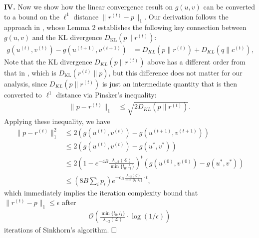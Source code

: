 \textbf{IV.} Now we show how the linear convergence result on $g(u,v)$ can be
converted to a bound on the $\ell^{1}$ distance $\|r^{(t)}-p\|_{1}$.
Our derivation follows the approach in \citet{altschuler2017near}, whose Lemma 2 establishes
the following key connection between $g(u,v)$ and the KL divergence
$D_{\text{KL}}(p\|r^{(t)})$: 
\begin{align*}
g(u^{(t)},v^{(t)})-g(u^{(t+1)},v^{(t+1)}) & =D_{KL}(p\|r^{(t)})+D_{KL}(q\|c^{(t)}),
\end{align*}
Note that the KL divergence $D_{KL}(p\|r^{(t)})$ above has a different
order from that in \citet{leger2021gradient}, which is $D_{\text{KL}}(r^{(t)}\|p)$, but
this difference does not matter for our analysis, since $D_{KL}(p\|r^{(t)})$
is just an intermediate quantity that is then converted to $\ell^{1}$
distance via Pinsker's inequality: 
\begin{align*}
\|p-r^{(t)}\|_{1} & \leq\sqrt{2D_{KL}(p\|r^{(t)})}.
\end{align*}
 Applying these inequality, we have 
\begin{align*}
\|p-r^{(t)}\|_{1}^{2}	&\leq2(g(u^{(t)},v^{(t)})-g(u^{(t+1)},v^{(t+1)}))
	\\ &\leq2(g(u^{(t)},v^{(t)})-g(u^{\ast},v^{\ast}))
	\\ &\leq2(1-e^{-4B}\frac{\lambda_{-2}(\mathcal{L})}{\min\{l_{0},l_{1}\}})^{t}(g(u^{(0)},v^{(0)})-g(u^{\ast},v^{\ast}))
	\\ &\leq(8B\sum_{i}p_{i})e^{-c_{B}\frac{\lambda_{-2}(\mathcal{L})}{\min\{l_{0},l_{1}\}}\cdot t},
\end{align*}
which immediately implies the iteration complexity bound that $\|r^{(t)}-p\|_1\leq \epsilon$ after
      \begin{align*}
          \mathcal{O} \left (\frac{\min\{l_{0},l_{1}\}}{\lambda_{-2}(\mathcal{L})} \cdot \log (1/\epsilon) \right )
      \end{align*}
      iterations of Sinkhorn's algorithm.
  $\hfill \square$

